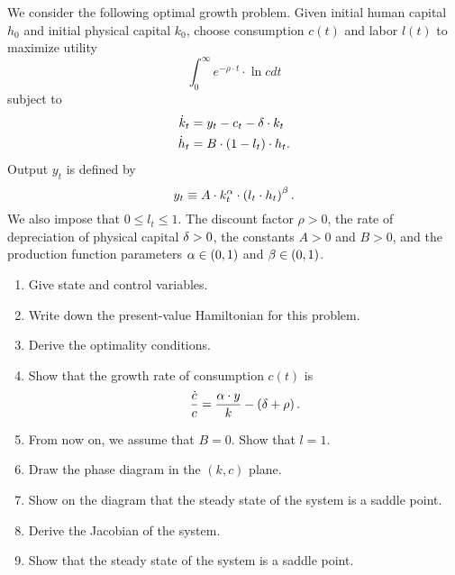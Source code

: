 \documentclass[letterpaper,12pt,leqno]{article}
\begin{document}
We consider the following optimal growth problem. Given initial human capital $h_{0}$ and initial physical capital $k_{0}$, choose consumption $c(t) $ and labor $l(t) $ to maximize utility
\begin{equation*}
\int_{0}^{\infty}e^{-\rho\cdot  t}\cdot \ln{c} dt
\end{equation*}
subject to
\begin{align*}
\dot{k}_{t} &=y_{t}-c_{t}-\delta\cdot  k_{t} \\
\dot{h}_{t} &=B\cdot \left( 1-l_{t} \right)\cdot  h_{t}.
\end{align*}
Output $y_{t}$ is defined by
\[y_{t}\equiv A\cdot k_{t}^{\alpha}\cdot \left( l_{t}\cdot h_{t} \right) ^{\beta}.\]
We also impose that $0 \leq l_{t}\leq 1$. The discount factor $\rho>0$, the rate of depreciation of physical capital $\delta>0$, the constants $A>0$ and $B>0$, and the production function parameters $\alpha\in \left( 0,1 \right)$ and $\beta \in\left( 0,1 \right)$.

\begin{enumerate}
\item Give state and control variables.
\item Write down the present-value Hamiltonian for this problem.
\item Derive the optimality conditions. 
\item Show that the growth rate of consumption $c(t)$ is
\begin{equation*}
\frac{\dot{c}}{c}=\frac{\alpha\cdot  y}{k}-\left( \delta +\rho \right) .
\end{equation*}
\item From now on, we assume that $B=0$. Show that $l=1$.
\item Draw the phase diagram in the $(k,c)$ plane.
\item Show on the diagram that the steady state of the system is a saddle point.
\item Derive the Jacobian of the system.
\item Show that the steady state of the system is a saddle point.
\end{enumerate}
\end{document}
